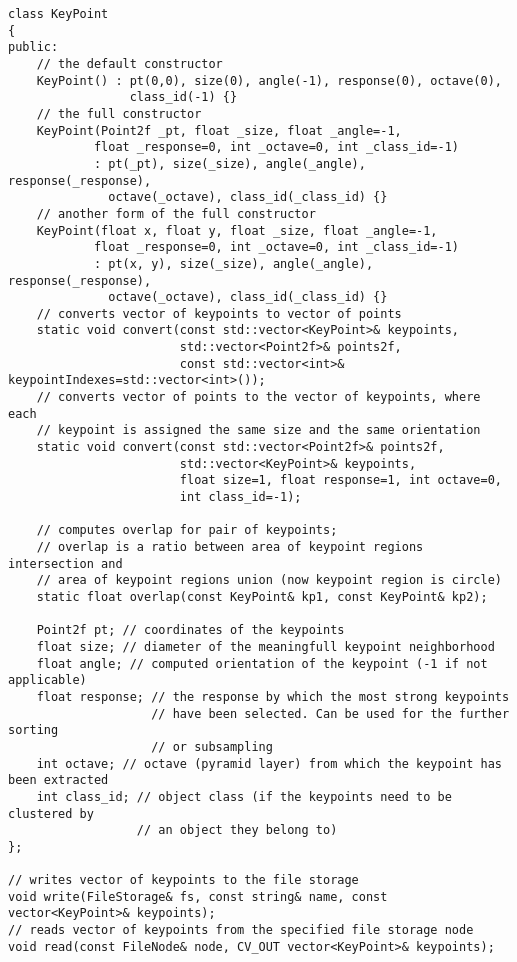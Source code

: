\begin{lstlisting}
class KeyPoint
{
public:
    // the default constructor
    KeyPoint() : pt(0,0), size(0), angle(-1), response(0), octave(0), 
				 class_id(-1) {}
    // the full constructor
    KeyPoint(Point2f _pt, float _size, float _angle=-1,
            float _response=0, int _octave=0, int _class_id=-1)
            : pt(_pt), size(_size), angle(_angle), response(_response), 
              octave(_octave), class_id(_class_id) {}
    // another form of the full constructor
    KeyPoint(float x, float y, float _size, float _angle=-1,
            float _response=0, int _octave=0, int _class_id=-1)
            : pt(x, y), size(_size), angle(_angle), response(_response), 
              octave(_octave), class_id(_class_id) {}
    // converts vector of keypoints to vector of points
    static void convert(const std::vector<KeyPoint>& keypoints,
                        std::vector<Point2f>& points2f,
                        const std::vector<int>& keypointIndexes=std::vector<int>());
    // converts vector of points to the vector of keypoints, where each 
    // keypoint is assigned the same size and the same orientation
    static void convert(const std::vector<Point2f>& points2f,
                        std::vector<KeyPoint>& keypoints,
                        float size=1, float response=1, int octave=0, 
                        int class_id=-1);

    // computes overlap for pair of keypoints;
    // overlap is a ratio between area of keypoint regions intersection and
    // area of keypoint regions union (now keypoint region is circle)
    static float overlap(const KeyPoint& kp1, const KeyPoint& kp2);

    Point2f pt; // coordinates of the keypoints
    float size; // diameter of the meaningfull keypoint neighborhood
    float angle; // computed orientation of the keypoint (-1 if not applicable)
    float response; // the response by which the most strong keypoints 
					// have been selected. Can be used for the further sorting 
					// or subsampling
    int octave; // octave (pyramid layer) from which the keypoint has been extracted
    int class_id; // object class (if the keypoints need to be clustered by 
				  // an object they belong to) 
};

// writes vector of keypoints to the file storage
void write(FileStorage& fs, const string& name, const vector<KeyPoint>& keypoints);
// reads vector of keypoints from the specified file storage node
void read(const FileNode& node, CV_OUT vector<KeyPoint>& keypoints);    
\end{lstlisting}


